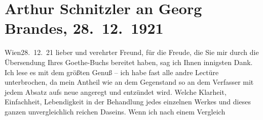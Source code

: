 

         
         \newcommand{\erwaehntePersonen}{Personen: Georg Brandes, Johann Wolfgang von Goethe, William Shakespeare}
         \newcommand{\erwaehnteOrte}{Orte: Kopenhagen, Wien}
         \newcommand{\erwaehnteWerke}{Werke: William Shakespeare, Wolfgang Goethe}
               \section[Arthur Schnitzler an Georg Brandes, 28. 12. 1921]{ Arthur Schnitzler an Georg Brandes, 28. 12. 1921}\nopagebreak{}\rehead{ }\begin{ledgroupsized}[t]{13cm}\normalsize\beginnumbering \toendnotes[C]{\smallbreak\pagebreak[2]} 
\toendnotes[C]{\smallbreak}\pstart
           \raggedleft{}{\pb}Wien28. 12. 21\pend
           \pstart
           lieber und verehrter Freund, für die Freude, die Sie mir durch die
                        Übersendung Ihres Goethe-Buchs bereitet haben, 
                        sag ich Ihnen innigsten Dank.
                        Ich lese es mit dem größten Genuß – ich habe fast alle andre Lectüre
                        unterbrochen, da mein Antheil wie an dem Gegenstand so an dem Verfasser mit
                        jedem Absatz aufs neue angeregt und entzündet wird. Welche Klarheit,
                        Einfachheit, Lebendigkeit in der Behandlung jedes einzelnen Werkes und
                        dieses ganzen unvergleichlich reichen Daseins. Wenn ich nach einem Vergleich

\end{ledgroupsized}
